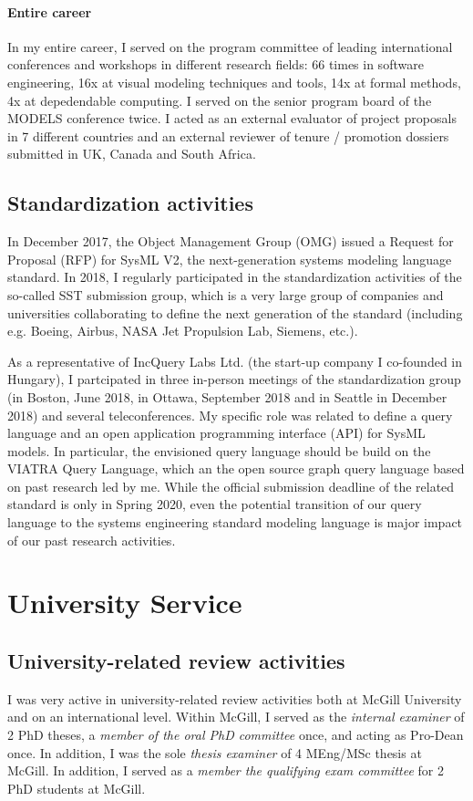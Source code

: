 \paragraph{Entire career}
In my entire career, I served on the program committee of leading international conferences and workshops in different research fields: 66 times in software engineering, 16x at visual modeling techniques and tools, 14x at formal methods, 4x at depedendable computing. I served on the senior program board of the MODELS conference twice. I acted as an external evaluator of project proposals in 7 different countries and an external reviewer of tenure / promotion dossiers submitted in UK, Canada and South Africa. 

\subsection{Standardization activities}
In December 2017, the Object Management Group (OMG) issued a Request for Proposal (RFP) for SysML V2, the next-generation systems modeling language standard. In 2018, I regularly participated in the standardization activities of the so-called SST submission group, which is a very large group of companies and universities collaborating to define the next generation of the standard (including e.g. Boeing, Airbus, NASA Jet Propulsion Lab, Siemens, etc.).

As a representative of IncQuery Labs Ltd. (the start-up company I co-founded in Hungary), I partcipated in three in-person meetings of the standardization group (in Boston, June 2018, in Ottawa, September 2018 and in Seattle in December 2018) and several teleconferences. My specific role was related to define a query language and an open application programming interface (API) for SysML models. In particular, the envisioned query language should be build on the VIATRA Query Language, which an the open source graph query language based on past research led by me. While the official submission deadline of the related standard is only in Spring 2020, even the potential transition of our query language to the systems engineering standard modeling language is major impact of our past research activities. 

\section{University Service}

\subsection{University-related review activities}
I was very active in university-related review activities both at McGill University and on an international level. Within McGill, I served as the \emph{internal examiner} of 2 PhD theses, a \emph{member of the oral PhD committee} once, and acting as Pro-Dean once. In addition, I was the sole \emph{thesis examiner} of 4 MEng/MSc thesis at McGill. In addition, I served as a \emph{member the qualifying exam committee} for 2 PhD students at McGill. 


